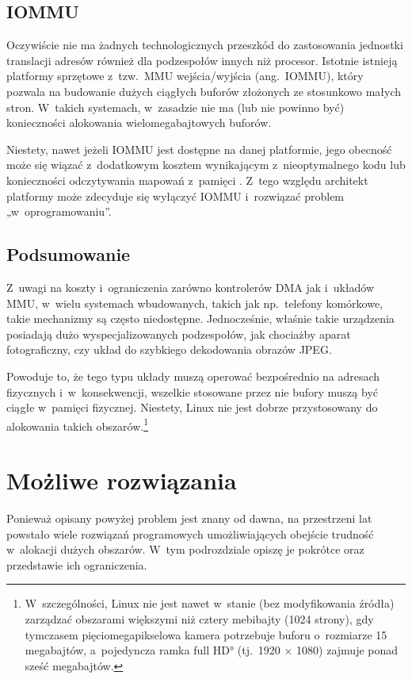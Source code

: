\subsection{IOMMU}

Oczywiście nie ma żadnych technologicznych przeszkód do zastosowania
jednostki translacji adresów również dla podzespołów innych niż
procesor.  Istotnie istnieją platformy sprzętowe z~tzw.\ MMU
wejścia/wyjścia (ang.\ IOMMU), który pozwala na budowanie dużych
ciągłych buforów złożonych ze stosunkowo małych stron.  W~takich
systemach, w~zasadzie nie ma (lub nie powinno być) konieczności
alokowania wielomegabajtowych buforów.

Niestety, nawet jeżeli IOMMU jest dostępne na danej platformie, jego
obecność może się wiązać z~dodatkowym kosztem wynikającym
z~nieoptymalnego kodu \autocite{bib:price-of-safety} lub konieczności
odczytywania mapowań z~pamięci
\autocite{bib:mitigate-iotlb-bottleneck}.  Z~tego względu architekt
platformy może zdecyduje się wyłączyć IOMMU i~rozwiązać problem
„w~oprogramowaniu”.

\subsection{Podsumowanie}

Z~uwagi na koszty i~ograniczenia zarówno kontrolerów DMA jak i~układów
MMU, w~wielu systemach wbudowanych, takich jak np.\ telefony
komórkowe, takie mechanizmy są często niedostępne.  Jednocześnie,
właśnie takie urządzenia posiadają dużo wyspecjalizowanych
podzespołów, jak chociażby aparat fotograficzny, czy układ do
szybkiego dekodowania obrazów JPEG.

Powoduje to, że tego typu układy muszą operować bezpośrednio na
adresach fizycznych i~w~konsekwencji, wszelkie stosowane przez nie
bufory muszą być ciągłe w~pamięci fizycznej.  Niestety, Linux nie jest
dobrze przystosowany do alokowania takich
obszarów.\footnote{W~szczególności, Linux nie jest nawet w~stanie (bez
  modyfikowania źródła) zarządzać obszarami większymi niż cztery
  mebibajty (1024 strony), gdy tymczasem pięciomegapikselowa kamera
  potrzebuje buforu o~rozmiarze 15 megabajtów, a~pojedyncza ramka
  \ang*{full HD} (tj.\ 1920 $\times$ 1080) zajmuje ponad sześć
  megabajtów.}


\section{Możliwe rozwiązania}

Ponieważ opisany powyżej problem jest znany od dawna, na przestrzeni
lat powstało wiele rozwiązań programowych umożliwiających obejście
trudność w~alokacji dużych obszarów.  W~tym podrozdziale opiszę je
pokrótce oraz przedstawie ich ograniczenia.

